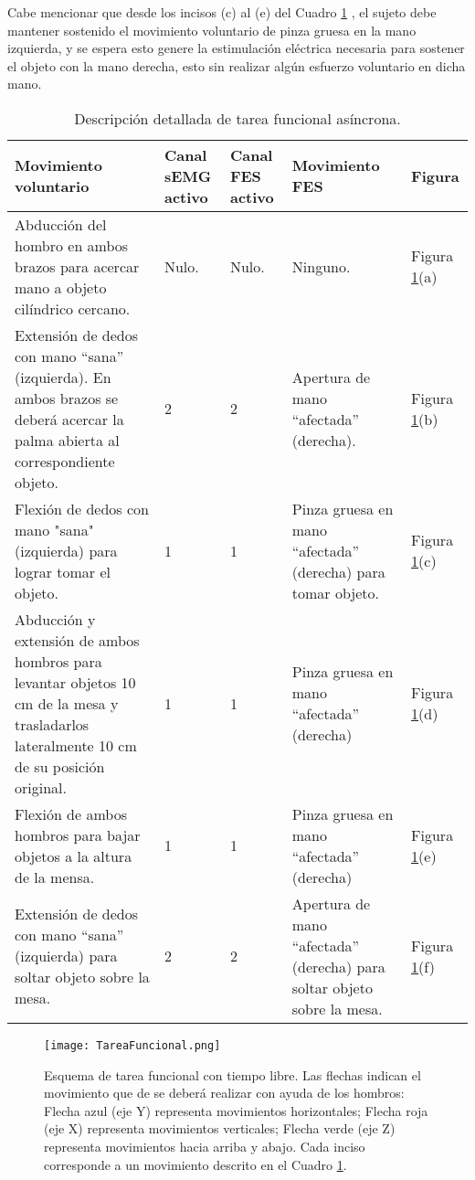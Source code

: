 Cabe mencionar que desde los incisos (c) al (e) del Cuadro \ref{Cuadro:TareaFunAsin} , el sujeto debe mantener sostenido el movimiento voluntario de pinza gruesa en la mano izquierda, y se espera esto genere la estimulación eléctrica necesaria para sostener el objeto con la mano derecha, esto sin realizar algún esfuerzo voluntario en dicha mano.

\begin{table}[htbp]
	\centering
	\begin{tabular}{|p{5cm}|p{1.4cm}|p{1.4cm}|p{3.5cm}|p{1.5cm}|}
	\hline
	\textbf{Movimiento voluntario} & \textbf{Canal sEMG activo} & \textbf{Canal FES activo} & \textbf{Movimiento FES} & \textbf{Figura}\\ \hline \hline
	Abducción del hombro en ambos brazos para acercar mano a objeto cilíndrico cercano. & Nulo. & Nulo. & Ninguno. & Figura \ref{Figura: TareaFuncional_P}(a)\\ \hline
	Extensión de dedos con mano ``sana'' (izquierda). En ambos brazos se deberá acercar la palma abierta al correspondiente objeto. & 2 & 2 & Apertura de mano ``afectada'' (derecha). & Figura \ref{Figura: TareaFuncional_P}(b)\\ \hline
	Flexión de dedos con mano "sana" (izquierda) para lograr tomar el objeto. & 1 & 1 & Pinza gruesa en mano ``afectada'' (derecha) para tomar objeto. & Figura \ref{Figura: TareaFuncional_P}(c)\\ \hline
	Abducción y extensión de ambos hombros para levantar objetos 10 cm de la mesa y trasladarlos lateralmente 10 cm de su posición original. & 1 & 1 & Pinza gruesa en mano ``afectada'' (derecha) & Figura \ref{Figura: TareaFuncional_P}(d)\\ \hline
	Flexión de ambos hombros para bajar objetos a la altura de la mensa. & 1 & 1 & Pinza gruesa en mano ``afectada'' (derecha) & Figura \ref{Figura: TareaFuncional_P}(e)\\ \hline
	Extensión de dedos con mano ``sana'' (izquierda) para soltar objeto sobre la mesa. & 2 & 2 & Apertura de mano ``afectada'' (derecha) para soltar objeto sobre la mesa. & Figura \ref{Figura: TareaFuncional_P}(f)\\ \hline
	\end{tabular}
	\caption{Descripción detallada de tarea funcional asíncrona.}
	\label{Cuadro:TareaFunAsin}
\end{table}

\begin{figure}[htbp]
	\centering
	\texttt{[image: TareaFuncional.png]}
	\caption[Esquema de tarea funcional con tiempo libre.]{Esquema de tarea funcional con tiempo libre. Las flechas indican el movimiento que de se deberá realizar con ayuda de los hombros: Flecha azul (eje Y) representa movimientos horizontales; Flecha roja (eje X) representa movimientos verticales; Flecha verde (eje Z) representa movimientos hacia arriba y abajo. Cada inciso corresponde a un movimiento descrito en el Cuadro \ref{Cuadro:TareaFunAsin}.}
	\label{Figura: TareaFuncional_P}
\end{figure}


